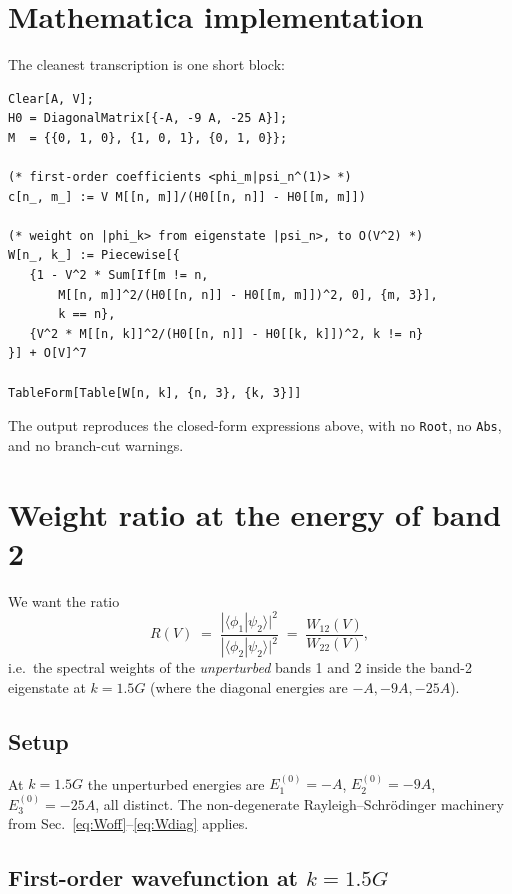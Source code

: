 \documentclass[11pt]{article}
\begin{document}
\section{Mathematica implementation}

The cleanest transcription is one short block:
\begin{verbatim}
Clear[A, V];
H0 = DiagonalMatrix[{-A, -9 A, -25 A}];
M  = {{0, 1, 0}, {1, 0, 1}, {0, 1, 0}};

(* first-order coefficients <phi_m|psi_n^(1)> *)
c[n_, m_] := V M[[n, m]]/(H0[[n, n]] - H0[[m, m]])

(* weight on |phi_k> from eigenstate |psi_n>, to O(V^2) *)
W[n_, k_] := Piecewise[{
   {1 - V^2 * Sum[If[m != n,
       M[[n, m]]^2/(H0[[n, n]] - H0[[m, m]])^2, 0], {m, 3}],
       k == n},
   {V^2 * M[[n, k]]^2/(H0[[n, n]] - H0[[k, k]])^2, k != n}
}] + O[V]^7

TableForm[Table[W[n, k], {n, 3}, {k, 3}]]
\end{verbatim}

The output reproduces the closed-form expressions above, with no \texttt{Root}, no \texttt{Abs}, and no branch-cut warnings.

\section{Weight ratio at the energy of band 2}

We want the ratio
\begin{equation}
R(V) \;=\; \frac{|\langle\phi_1|\psi_2\rangle|^2}{|\langle\phi_2|\psi_2\rangle|^2} \;=\; \frac{W_{12}(V)}{W_{22}(V)},
\end{equation}
i.e.\ the spectral weights of the \emph{unperturbed} bands 1 and 2 inside the band-2 eigenstate at $k = 1.5G$ (where the diagonal energies are $-A, -9A, -25A$).

\subsection{Setup}

At $k = 1.5G$ the unperturbed energies are $E_1^{(0)} = -A$, $E_2^{(0)} = -9A$, $E_3^{(0)} = -25A$, all distinct. The non-degenerate Rayleigh--Schr\"odinger machinery from Sec.~\ref{eq:Woff}--\ref{eq:Wdiag} applies.

\subsection{First-order wavefunction at $k = 1.5G$}
\end{document}
